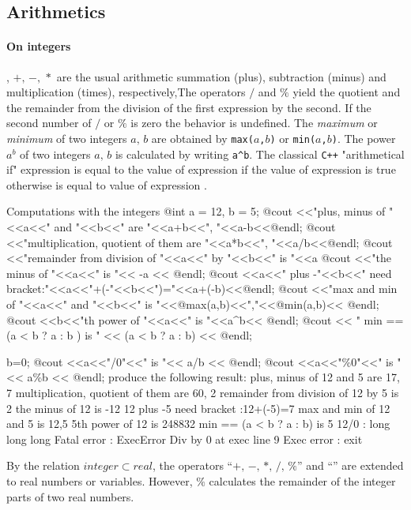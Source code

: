 \documentclass[a4paper,twoside,12pt]{book}
\def\key#1{\emph{#1}\index{#1}}
\begin{document}
\subsection{Arithmetics}
\paragraph{On integers}, $+,\, -,\, *$ are the usual arithmetic summation (plus),
subtraction (minus) and multiplication (times), respectively,The operators $/$ and $\%$ yield the quotient and the remainder from the division of the first expression by the second.
If the second number of $/$ or $\%$ is zero the behavior is undefined.
The \key{maximum} or \key{minimum} of two integers $a,\, b$ are obtained
by \texttt{max($a$,$b$)} or
\texttt{min($a$,$b$)}.
The power $a^b$ of two integers $a,\, b$ is calculated by writing \verb|a^b|.
The classical \texttt{C++}
"arithmetical if"  expression  is equal to  the value of expression  if
the value of expression   is true otherwise is equal to value of expression .

\begin{example} Computations with the integers
\label{exm:int}
\bFF
@int a = 12, b = 5;
@cout <<"plus, minus of "<<a<<" and "<<b<<" are "<<a+b<<", "<<a-b<<@endl;
@cout <<"multiplication, quotient of them are "<<a*b<<", "<<a/b<<@endl;
@cout <<"remainder from division of "<<a<<" by "<<b<<" is "<<a%
@cout <<"the minus of "<<a<<" is "<< -a << @endl;
@cout <<a<<" plus -"<<b<<" need bracket:"<<a<<"+(-"<<b<<")="<<a+(-b)<<@endl;
@cout <<"max and min of "<<a<<" and "<<b<<" is "<<@max(a,b)<<","<<@min(a,b)<< @endl;
@cout <<b<<"th power of "<<a<<" is "<<a^b<< @endl;
@cout << " min  == (a < b ? a : b )  is " << (a < b ? a : b) << @endl;

b=0;
@cout <<a<<"/0"<<" is "<< a/b << @endl;
@cout <<a<<"\%0"<<" is "<< a\%b << @endl;
\eFF
produce the following result:
\bFF
plus, minus of 12 and 5 are 17, 7
multiplication, quotient of them are 60, 2
remainder from division of 12 by 5 is 2
the minus of 12 is -12
12 plus -5 need bracket :12+(-5)=7
max and min of 12 and 5 is 12,5
5th power of 12 is 248832
min == (a < b ? a : b)   is 5
12/0 : long long long
Fatal error : ExecError  Div by 0 at exec line  9
Exec error : exit
\eFF
\end{example}

By the relation $integer\subset real$, the operators
``$+,\, -,\, *,\, /,\, \%$'' and ``''
are extended to real numbers or variables. However,  $\%$
calculates the remainder of the integer parts of two real numbers.
\end{document}
